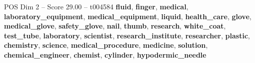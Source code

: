 \begin{textsample}{POS Dim 2 – Score 29.00 – t004584}  \label{ex:f2_pos_020}
\textbf{fluid}, \textbf{finger}, \textbf{medical}, \textbf{laboratory\_equipment}, \textbf{medical\_equipment}, \textbf{liquid}, \textbf{health\_care}, \textbf{glove}, \textbf{medical\_glove}, \textbf{safety\_glove}, \textbf{nail}, \textbf{thumb}, \textbf{research}, \textbf{white\_coat}, \textbf{test\_tube}, \textbf{laboratory}, \textbf{scientist}, \textbf{research\_institute}, \textbf{researcher}, \textbf{plastic}, \textbf{chemistry}, \textbf{science}, \textbf{medical\_procedure}, \textbf{medicine}, \textbf{solution}, \textbf{chemical\_engineer}, \textbf{chemist}, \textbf{cylinder}, \textbf{hypodermic\_needle}

\end{textsample}
